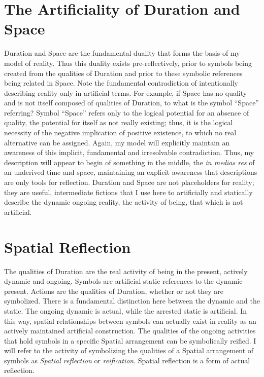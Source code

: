 \section{The Artificiality of Duration and Space}
\label{section:the_artificiality_of_duration_and_space}

Duration and Space are the fundamental duality that forms the basis of
my model of reality.  Thus this duality exists pre-reflectively, prior
to symbols being created from the qualities of Duration and prior to
these symbolic references being related in Space.  Note the
fundamental contradiction of intentionally describing reality only in
artificial terms.  For example, if Space has no quality and is not
itself composed of qualities of Duration, to what is the symbol
``Space'' referring?  Symbol ``Space'' refers only to the logical
potential for an absence of quality, the potential for itself as not
really existing; thus, it is the logical necessity of the negative
implication of positive existence, to which no real alternative can be
assigned.  Again, my model will explicitly maintain an awareness of
this implicit, fundamental and irresolvable contradiction.  Thus, my
description will appear to begin of something in the middle, the
\emph{in medias res} of an underived time and space, maintaining an
explicit awareness that descriptions are only tools for reflection.
Duration and Space are not placeholders for reality; they are useful,
intermediate fictions that I use here to artificially and statically
describe the dynamic ongoing reality, the activity of being, that
which is not artificial.

\section{Spatial Reflection}

The qualities of Duration are the real activity of being in the
present, actively dynamic and ongoing.  Symbols are artificial static
references to the dynamic present.  Actions are the qualities of
Duration, whether or not they are symbolized.  There is a fundamental
distinction here between the dynamic and the static.  The ongoing
dynamic is actual, while the arrested static is artificial.  In this
way, spatial relationships between symbols can actually exist in
reality as an actively maintained artificial construction.  The
qualities of the ongoing activities that hold symbols in a specific
Spatial arrangement can be symbolically reified.  I will refer to the
activity of symbolizing the qualities of a Spatial arrangement of
symbols as \emph{Spatial reflection} or \emph{reification}.  Spatial
reflection is a form of actual reflection.

